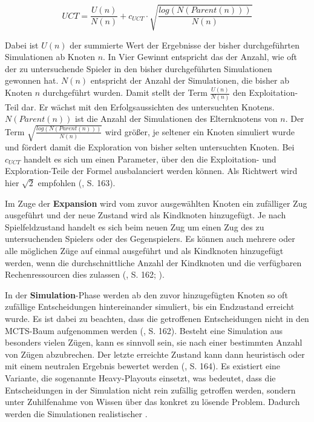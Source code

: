 \begin{equation}\label{uct-formula}
	UCT = \frac{U(n)}{N(n)} + c_{UCT} \cdot \sqrt{\frac{log(N(Parent(n)))}{N(n)}}
\end{equation}

Dabei ist $U(n)$ der summierte Wert der Ergebnisse der bisher durchgeführten Simulationen ab Knoten $n$. In Vier Gewinnt entspricht das der Anzahl, wie oft der zu untersuchende Spieler in den bisher durchgeführten Simulationen gewonnen hat. $N(n)$ entspricht der Anzahl der Simulationen, die bisher ab Knoten $n$ durchgeführt wurden. Damit stellt der Term $\frac{U(n)}{N(n)}$ den Exploitation-Teil dar. Er wächst mit den Erfolgsaussichten des untersuchten Knotens.
$N(Parent(n))$ ist die Anzahl der Simulationen des Elternknotens von $n$. Der Term $\sqrt{\frac{log(N(Parent(n)))}{N(n)}}$ wird größer, je seltener ein Knoten simuliert wurde und fördert damit die Exploration von bisher selten untersuchten Knoten.
Bei $c_{UCT}$ handelt es sich um einen Parameter, über den die Exploitation- und Exploration-Teile der Formel ausbalanciert werden können. Als Richtwert wird hier $\sqrt{2}$ empfohlen (\cite{Russell.2020}, S. 163).

Im Zuge der \textbf{Expansion} wird vom zuvor ausgewählten Knoten ein zufälliger Zug ausgeführt und der neue Zustand wird als Kindknoten hinzugefügt. Je nach Spielfeldzustand handelt es sich beim neuen Zug um einen Zug des zu untersuchenden Spielers oder des Gegenspielers. Es können auch mehrere oder alle möglichen Züge auf einmal ausgeführt und als Kindknoten hinzugefügt werden, wenn die durchschnittliche Anzahl der Kindknoten und die verfügbaren Rechenressourcen dies zulassen (\cite{Russell.2020}, S. 162; \cite{Browne.2012}).

In der \textbf{Simulation}-Phase werden ab den zuvor hinzugefügten Knoten so oft zufällige Entscheidungen hintereinander simuliert, bis ein Endzustand erreicht wurde. Es ist dabei zu beachten, dass die getroffenen Entscheidungen nicht in den MCTS-Baum aufgenommen werden (\cite{Russell.2020}, S. 162). Besteht eine Simulation aus besonders vielen Zügen, kann es sinnvoll sein, sie nach einer bestimmten Anzahl von Zügen abzubrechen. Der letzte erreichte Zustand kann dann heuristisch oder mit einem neutralen Ergebnis bewertet werden (\cite{Russell.2020}, S. 164). Es existiert eine Variante, die sogenannte Heavy-Playouts einsetzt, was bedeutet, dass die Entscheidungen in der Simulation nicht rein zufällig getroffen werden, sondern unter Zuhilfenahme von Wissen über das konkret zu lösende Problem. Dadurch werden die Simulationen realistischer \cite{Browne.2012}.

